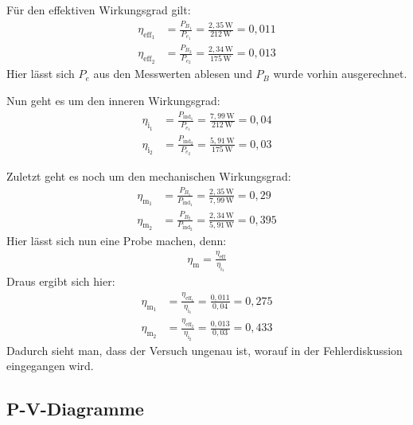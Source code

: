 \documentclass[fontsize=12pt]{scrartcl}
\begin{document}
Für den effektiven Wirkungsgrad gilt:
\begin{align*}
 \eta_{\text{eff}_1}&= \frac{P_{B_1}}{P_{e_1}} = \frac{2,35\,\text{W}}{212\,\text{W}} = 0,011 \\
  \eta_{\text{eff}_2}&= \frac{P_{B_2}}{P_{e_2}} = \frac{2,34\,\text{W}}{175\,\text{W}} = 0,013
\end{align*}
Hier lässt sich $ P_{e}$ aus den Messwerten ablesen und $P_B$ wurde vorhin ausgerechnet. \par

Nun geht es um den inneren Wirkungsgrad:
\begin{align*}
 \eta_{\text{i}_1}&=\frac{P_{\text{ind}_1}}{P_{e_1}} = \frac{7,99\,\text{W}}{212\,\text{W}}= 0,04 \\
  \eta_{\text{i}_2}&=\frac{P_{\text{ind}_2}}{P_{e_2}} = \frac{5,91\,\text{W}}{175\,\text{W}}= 0,03
\end{align*}

Zuletzt geht es noch um den mechanischen Wirkungsgrad:
\begin{align*}
\eta_{\text{m}_1} &= \frac{P_{B_1}}{P_{\text{ind}_1}}= \frac{2,35\,\text{W}}{7,99\,\text{W}} = 0,29 \\
  \eta_{\text{m}_2}&= \frac{P_{B_2}}{P_{\text{ind}_2}} = \frac{2,34\,\text{W}}{5,91\,\text{W}} = 0,395
\end{align*}
Hier lässt sich nun eine Probe machen, denn:
\begin{align*}
\eta_{\text{m}}=\frac{ \eta_{\text{eff}}}{ \eta_{\text{i}_1}}
\end{align*}
Draus ergibt sich hier:
\begin{align*}
\eta_{\text{m}_1}&=\frac{ \eta_{\text{eff}_1}}{ \eta_{\text{i}_1}} = \frac{0,011}{0,04}= 0,275\\
\eta_{\text{m}_2}&=\frac{ \eta_{\text{eff}_2}}{ \eta_{\text{i}_2}} = \frac{0,013}{0,03}= 0,433
\end{align*}
Dadurch sieht man, dass der Versuch ungenau ist, worauf in der Fehlerdiskussion eingegangen wird.
\newpage
\subsection{P-V-Diagramme}
\end{document}
